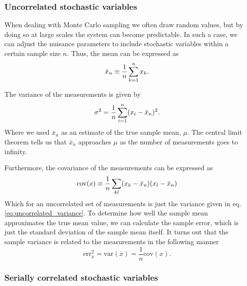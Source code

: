 \documentclass[
    a4paper, aps, twocolumn, floatfix, superscriptaddress,
    nofootinbib]{revtex4-1}
\begin{document}
\subsubsection{Uncorrelated stochastic variables}
When dealing with Monte Carlo sampling we often draw random values, but by doing so at large scales the system can become predictable. In such a case, we can adjust the nuisance parameters to include stochastic variables within a certain sample size $n$. Thus, the mean can be expressed as
\begin{equation}%
    \Bar{x}_n \equiv \frac{1}{n} \sum_{k=1}^n x_k. \label{eq:uncorrelated_mean}
\end{equation}

The variance of the measurements is given by
\begin{equation}%
    \sigma^2 = \frac{1}{n}\sum_{i=1}^n (x_i - \Bar{x}_n)^2. \label{eq:uncorrelated_variance}
\end{equation}
 Where we used $\bar{x}_n$ as an estimate of the true sample mean, $\mu$. The central limit theorem tells us that $\bar{x}_n$ approaches $\mu$ as the number of measurements goes to infinity.

 
Furthermore, the covariance of the measurements can be expressed as
\begin{equation}\label{eq:32}
    \text{cov}(x) \equiv \frac{1}{n} \sum_{kl} (x_k-\Bar{x}_n)(x_l-\Bar{x}_n)  
\end{equation}
Which for an uncorrelated set of measurements is just the variance given in eq.\eqref{eq:uncorrelated_variance}. 
To determine how well the sample mean approximates the true mean value, we can calculate the sample error, which is just the standard deviation of the sample mean itself. It turns out that the sample variance is related to the measurements in the following manner \cite{Stat.Phys.}
\begin{equation}\label{eq:33}
    \text{err}_{\overline{x}}^2 = \text{var}(\overline{x})= \frac{1}{n}\text{cov}(x). 
\end{equation}

\subsubsection{Serially correlated stochastic variables}
\end{document}
